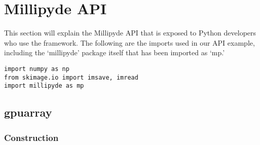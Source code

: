 

\chapter{Millipyde API}

This section will explain the Millipyde API that is exposed to Python developers who use the framework. The following are the imports used in our API example, including the `millipyde' package itself that has been imported as `mp.'

\begin{lstlisting}
import numpy as np
from skimage.io import imsave, imread
import millipyde as mp
\end{lstlisting}

\section{gpuarray}

\subsection{Construction}

